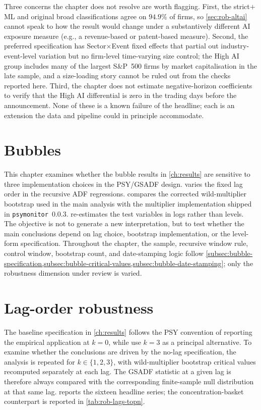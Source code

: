 Three concerns the chapter does not resolve are worth flagging.
First, the strict$+$ML and original broad classifications agree on
$94.9\%$ of firms, so \cref{sec:rob-altai} cannot speak to how the
result would change under a substantively different AI exposure
measure (e.g., a revenue-based or patent-based measure). Second, the
preferred specification has Sector$\times$Event fixed effects that
partial out industry-event-level variation but no firm-level
time-varying size control; the High AI group includes many of the
largest S\&P~500 firms by market capitalisation in the late sample,
and a size-loading story cannot be ruled out from the checks reported
here. Third, the chapter does not estimate negative-horizon
coefficients to verify that the High AI differential is zero in the
trading days before the announcement. None of these is a known
failure of the headline; each is an extension the data and pipeline
could in principle accommodate.


\section{Bubbles}

This chapter examines whether the bubble results in \cref{ch:results} are sensitive to three implementation choices in the PSY/GSADF design.  varies the fixed lag order in the recursive ADF regressions.  compares the corrected wild-multiplier bootstrap used in the main analysis with the multiplier implementation shipped in \texttt{psymonitor}~0.0.3.  re-estimates the test variables in logs rather than levels. The objective is not to generate a new interpretation, but to test whether the main conclusions depend on lag choice, bootstrap implementation, or the level-form specification. Throughout the chapter, the sample, recursive window rule, control window, bootstrap count, and date-stamping logic follow \cref{subsec:bubble-specification,subsec:bubble-critical-values,subsec:bubble-date-stamping}; only the robustness dimension under review is varied.


\section{Lag-order robustness}
\label{sec:rob-lags}

The baseline specification in \cref{ch:results} follows the PSY convention of reporting the empirical application at $k=0$, while \citet[footnote~22]{phillipsShiYu2015a} use $k=3$ as a principal alternative. To examine whether the conclusions are driven by the no-lag specification, the analysis is repeated for $k\in\{1,2,3\}$, with wild-multiplier bootstrap critical values recomputed separately at each lag. The GSADF statistic at a given lag is therefore always compared with the corresponding finite-sample null distribution at that same lag.  reports the sixteen headline series; the concentration-basket counterpart is reported in \cref{tab:rob-lags-topn}.

